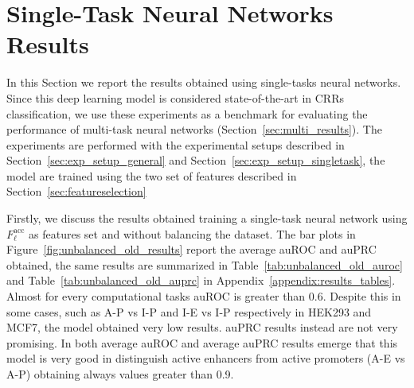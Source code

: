 \section{Single-Task Neural Networks Results}
\label{sec:single_results}
In this Section we report the results obtained using single-tasks neural networks. Since this deep learning model is considered state-of-the-art in CRRs classification, we use these experiments as a benchmark for evaluating the performance of multi-task neural networks (Section~\ref{sec:multi_results}). The experiments are performed with the experimental setups described in Section~\ref{sec:exp_setup_general} and Section~\ref{sec:exp_setup_singletask}, the model are trained using the two set of features described in Section~\ref{sec:featureselection} 

Firstly, we discuss the results obtained training a single-task neural network using $F_\ell^{\textrm{acc}}$ as features set and without balancing the dataset. The bar plots in Figure~\ref{fig:unbalanced_old_results} report the average auROC and auPRC obtained, the same results are summarized in Table~\ref{tab:unbalanced_old_auroc} and Table~\ref{tab:unbalanced_old_auprc} in Appendix~\ref{appendix:results_tables}. Almost for every computational tasks auROC is greater than 0.6. Despite this in some cases, such as A-P vs I-P and I-E vs I-P respectively in HEK293 and MCF7, the model obtained very low results. auPRC results instead are not very promising. In both average auROC and average auPRC results emerge that this model is very good in distinguish active enhancers from active promoters (A-E vs A-P) obtaining always values greater than 0.9.
